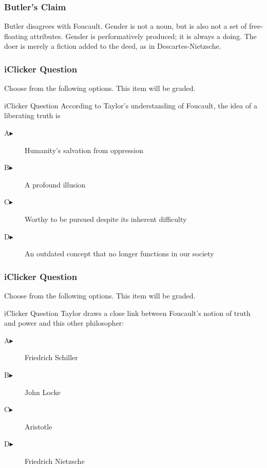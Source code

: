 \documentclass[xcolor=dvipsnames]{beamer}
\begin{document}
\begin{frame}
  \frametitle{Butler's Claim}
  Butler disagrees with Foucault. Gender is not a noun, but is also
  not a set of free-floating attributes. Gender is performatively
  produced; it is always a doing. The doer is merely a fiction added
  to the deed, as in Descartes-Nietzsche.
\end{frame}

\begin{frame}
  \frametitle{iClicker Question}
Choose from the following options. This item will be graded.
\begin{block}{iClicker Question}
  According to Taylor's understanding of Foucault, the idea of a
  liberating truth is 
\end{block}
\begin{description}
\item[A\hspace{.2in}$\blacktriangleright$] Humanity's salvation from oppression
\item[B\hspace{.2in}$\blacktriangleright$] A profound illusion
\item[C\hspace{.2in}$\blacktriangleright$] Worthy to be pursued despite its inherent difficulty
\item[D\hspace{.2in}$\blacktriangleright$] An outdated concept that no longer functions in our society
\end{description}
\end{frame}

\begin{frame}
  \frametitle{iClicker Question}
Choose from the following options. This item will be graded.
\begin{block}{iClicker Question}
  Taylor draws a close link between Foucault's notion of truth and
  power and this other philosopher:
\end{block}
\begin{description}
\item[A\hspace{.2in}$\blacktriangleright$] Friedrich Schiller
\item[B\hspace{.2in}$\blacktriangleright$] John Locke
\item[C\hspace{.2in}$\blacktriangleright$] Aristotle
\item[D\hspace{.2in}$\blacktriangleright$] Friedrich Nietzsche
\end{description}
\end{frame}
\end{document}
